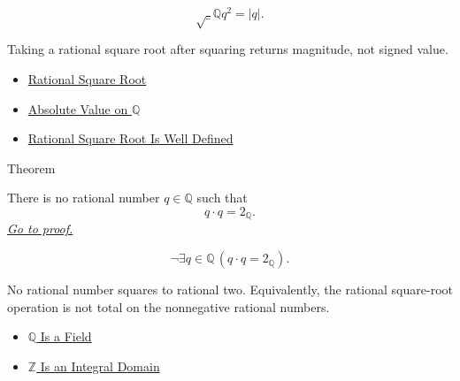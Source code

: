 \begin{remark*}
\[
\sqrt_{\mathbb{Q}}{q^2}=|q|.
\]
\end{remark*}

\begin{remark*}[Interpretation]
Taking a rational square root after squaring returns magnitude, not signed
value.
\end{remark*}

\begin{dependencies}
\begin{itemize}
  \item \hyperref[def:rational-square-root]{Rational Square Root}
  \item \hyperref[def:absolute-value-on-q]{Absolute Value on $\mathbb{Q}$}
  \item \hyperref[thm:rational-square-root-well-defined]{Rational Square Root Is Well Defined}
\end{itemize}
\end{dependencies}

\begin{theorembox}{Theorem}
\begin{theorem}
\label{thm:no-rational-square-root-of-two}
There is no rational number $q\in\mathbb{Q}$ such that
\[
q\cdot q=2_{\mathbb{Q}}.
\]
\hyperref[prf:no-rational-square-root-of-two]{\textit{Go to proof.}}
\end{theorem}
\end{theorembox}

\begin{remark*}
\[
\neg\exists q\in\mathbb{Q}\,(q\cdot q=2_{\mathbb{Q}}).
\]
\end{remark*}

\begin{remark*}[Interpretation]
No rational number squares to rational two. Equivalently, the rational
square-root operation is not total on the nonnegative rational numbers.
\end{remark*}

\begin{dependencies}
\begin{itemize}
  \item \hyperref[thm:q-is-a-field]{$\mathbb{Q}$ Is 
a Field}
  \item \hyperref[thm:z-integral-domain]{$\mathbb{Z}$ Is an Integral Domain}
\end{itemize}
\end{dependencies}

